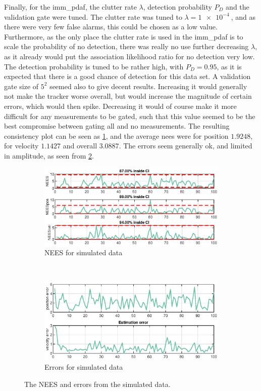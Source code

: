 Finally, for the \acrshort{imm_pdaf}, the clutter rate $\lambda$, detection probability $P_D$ and the validation gate were tuned. The clutter rate was tuned to $\lambda = \SI{1e-4}{}$, and as there were very few false alarms, this could be chosen as a low value. Furthermore, as the only place the clutter rate is used in the \acrshort{imm_pdaf} is to scale the probability of no detection, there was really no use further decreasing $\lambda$, as it already would put the association likelihood ratio for no detection very low. The detection probability is tuned to be rather high, with $P_D = 0.95$, as it is expected that there is a good chance of detection for this data set. A validation gate size of $5^2$ seemed also to give decent results. Increasing it would generally not make the tracker worse overall, but would increase the magnitude of certain errors, which would then spike. Decreasing it would of course make it more difficult for any measurements to be gated, such that this value seemed to be the best compromise between gating all and no measurements. The resulting consistency plot can be seen as \cref{fig:ga_1_2_NEES}, and the average \acrshort{nees} were for position $1.9248$, for velocity $1.1427$ and overall $3.0887$. The errors seem generally ok, and limited in amplitude, as seen from \cref{fig:ga_1_2_error}. 

\begin{figure}[ht]
    \centering
	\begin{subfigure}[h]{0.4\textwidth}
		\includegraphics[width=\textwidth]{figures/ga_1/2_NEES}
		\caption{NEES for simulated data}
		\label{fig:ga_1_2_NEES}
    \end{subfigure}%
    ~
    \begin{subfigure}[h]{0.4\textwidth}
        \includegraphics[width=\textwidth]{figures/ga_1/2_error}
        \caption{Errors for simulated data}
        \label{fig:ga_1_2_error}
    \end{subfigure}
    \caption{The NEES and errors from the simulated data. }
    \label{fig:ga_1_2_NEES_and_error} 
\end{figure}

